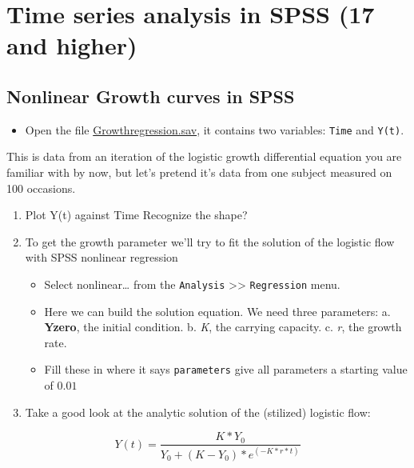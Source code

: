 \documentclass[]{book}
\providecommand{\tightlist}{%
  \setlength{\itemsep}{0pt}\setlength{\parskip}{0pt}}
\let\stdsection\section
\renewcommand\section{\newpage\stdsection}
\begin{document}
\section{\texorpdfstring{\textbf{Time series analysis in SPSS (17 and
higher)}}{Time series analysis in SPSS (17 and higher)}}\label{time-series-analysis-in-spss-17-and-higher}

\subsection{Nonlinear Growth curves in
SPSS}\label{nonlinear-growth-curves-in-spss}

\begin{itemize}
\tightlist
\item
  Open the file
  \href{https://github.com/FredHasselman/DCS/blob/master/assignmentData/BasicTSA_nonlinreg/GrowthRegression.sav}{Growthregression.sav},
  it contains two variables: \texttt{Time} and \texttt{Y(t)}.
\end{itemize}

This is data from an iteration of the logistic growth differential
equation you are familiar with by now, but let's pretend it's data from
one subject measured on 100 occasions.

\begin{enumerate}
\def\labelenumi{\arabic{enumi}.}
\tightlist
\item
  Plot Y(t) against Time Recognize the shape?
\item
  To get the growth parameter we'll try to fit the solution of the
  logistic flow with SPSS nonlinear regression

  \begin{itemize}
  \tightlist
  \item
    Select nonlinear\ldots{} from the \texttt{Analysis}
    \textgreater{}\textgreater{} \texttt{Regression} menu.
  \item
    Here we can build the solution equation. We need three parameters:
    a. \textbf{Yzero}, the initial condition. b. \emph{K}, the carrying
    capacity. c. \emph{r}, the growth rate.
  \item
    Fill these in where it says \texttt{parameters} give all parameters
    a starting value of \(0.01\)
  \end{itemize}
\item
  Take a good look at the analytic solution of the (stilized) logistic
  flow:
\end{enumerate}

\[
Y(t)  =  \frac{K * Y_0}{Y_0 + \left(K-Y_{0}\right) * e^{(-K*r*t)} }
\]
\end{document}
